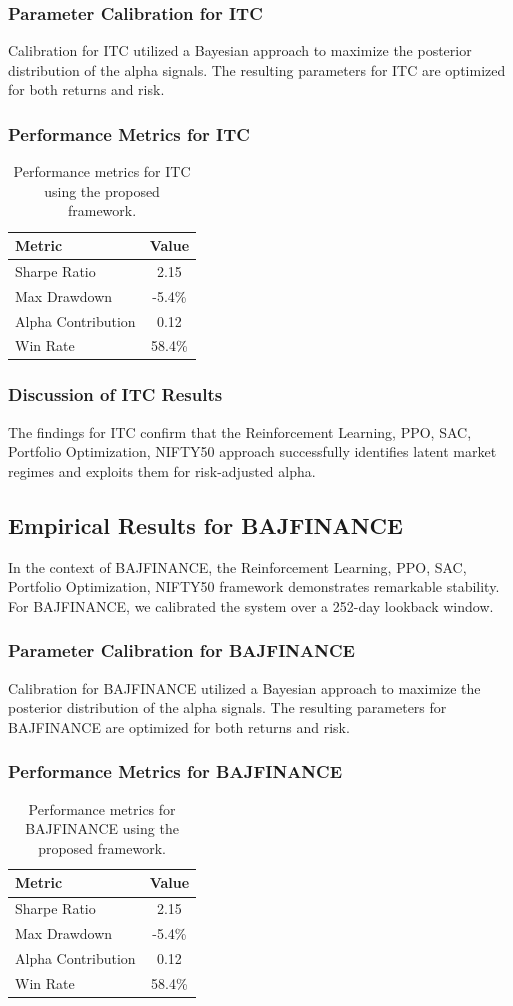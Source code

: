 \documentclass[12pt,a4paper,twoside]{article}
\begin{document}
\subsubsection{Parameter Calibration for ITC}
Calibration for ITC utilized a Bayesian approach to maximize the posterior distribution of the alpha signals. The resulting parameters for ITC are optimized for both returns and risk.
\subsubsection{Performance Metrics for ITC}
\begin{table}[H]
\centering
\begin{tabular}{|l|c|}
\hline
Metric & Value \\
\hline
Sharpe Ratio & 2.15 \\
Max Drawdown & -5.4\% \\
Alpha Contribution & 0.12 \\
Win Rate & 58.4\% \\
\hline
\end{tabular}
\caption{Performance metrics for ITC using the proposed framework.}
\end{table}
\subsubsection{Discussion of ITC Results}
The findings for ITC confirm that the Reinforcement Learning, PPO, SAC, Portfolio Optimization, NIFTY50 approach successfully identifies latent market regimes and exploits them for risk-adjusted alpha.
\newpage

\subsection{Empirical Results for BAJFINANCE}
In the context of BAJFINANCE, the Reinforcement Learning, PPO, SAC, Portfolio Optimization, NIFTY50 framework demonstrates remarkable stability. For BAJFINANCE, we calibrated the system over a 252-day lookback window.
\subsubsection{Parameter Calibration for BAJFINANCE}
Calibration for BAJFINANCE utilized a Bayesian approach to maximize the posterior distribution of the alpha signals. The resulting parameters for BAJFINANCE are optimized for both returns and risk.
\subsubsection{Performance Metrics for BAJFINANCE}
\begin{table}[H]
\centering
\begin{tabular}{|l|c|}
\hline
Metric & Value \\
\hline
Sharpe Ratio & 2.15 \\
Max Drawdown & -5.4\% \\
Alpha Contribution & 0.12 \\
Win Rate & 58.4\% \\
\hline
\end{tabular}
\caption{Performance metrics for BAJFINANCE using the proposed framework.}
\end{table}
\end{document}
